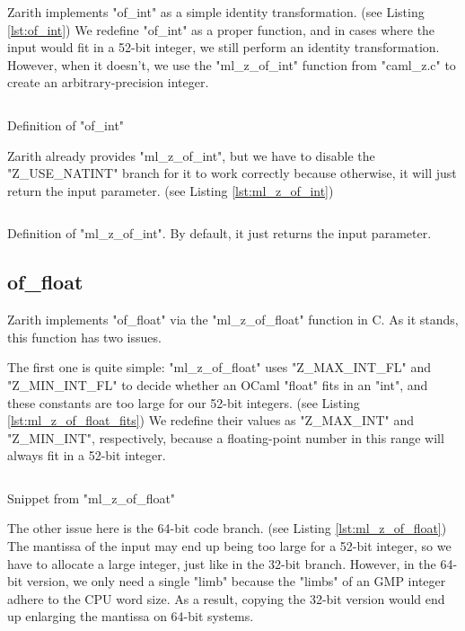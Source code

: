 \documentclass{scrartcl}
\begin{document}
Zarith implements "of\_int" as a simple identity transformation. (see Listing \ref{lst:of_int}) We redefine "of\_int" as a proper function, and in cases where the input would fit in a 52-bit integer, we still perform an identity transformation. However, when it doesn't, we use the "ml\_z\_of\_int" function from "caml\_z.c" to create an arbitrary-precision integer.

\begin{listing}[ht]
\inputminted[linenos, firstline=30, lastline=30]{ocaml}{z.ml}
\caption{Definition of "of\_int"}
\label{lst:of_int}
\end{listing}

Zarith already provides "ml\_z\_of\_int", but we have to disable the "Z\_USE\_NATINT" branch for it to work correctly because otherwise, it will just return the input parameter. (see Listing \ref{lst:ml_z_of_int})

\begin{listing}[ht]
\inputminted[linenos, firstline=441, lastline=459]{c}{caml_z.c}
\caption{Definition of "ml\_z\_of\_int". By default, it just returns the input parameter.}
\label{lst:ml_z_of_int}
\end{listing}

\subsection{of\_float}

Zarith implements "of\_float" via the "ml\_z\_of\_float" function in C. As it stands, this function has two issues.

The first one is quite simple: "ml\_z\_of\_float" uses "Z\_MAX\_INT\_FL" and "Z\_MIN\_INT\_FL" to decide whether an OCaml "float" fits in an "int", and these constants are too large for our 52-bit integers. (see Listing \ref{lst:ml_z_of_float_fits}) We redefine their values as "Z\_MAX\_INT" and "Z\_MIN\_INT", respectively, because a floating-point number in this range will always fit in a 52-bit integer.

\begin{listing}[ht]
\inputminted[linenos, firstline=533, lastline=542]{c}{caml_z.c}
\caption{Snippet from "ml\_z\_of\_float"}
\label{lst:ml_z_of_float_fits}
\end{listing}

The other issue here is the 64-bit code branch. (see Listing \ref{lst:ml_z_of_float}) The mantissa of the input may end up being too large for a 52-bit integer, so we have to allocate a large integer, just like in the 32-bit branch. However, in the 64-bit version, we only need a single "limb" because the "limbs" of an GMP integer adhere to the CPU word size. As a result, copying the 32-bit version would end up enlarging the mantissa on 64-bit systems.
\end{document}
